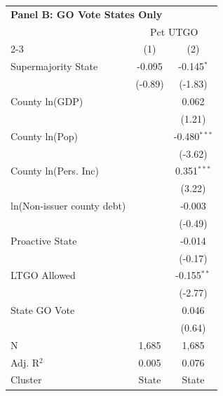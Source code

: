 \begingroup
\centering
\begin{tabular*}{\textwidth}{@{\extracolsep{\fill}}lcc}
\multicolumn{5}{l}{\textbf{Panel B: GO Vote States Only}}\\

\addlinespace
   \toprule
    & \multicolumn{2}{c}{Pct UTGO}\\
   \cmidrule(lr){2-3}
                              & (1)      & (2)\\  
   \midrule 
   Supermajority State        & -0.095   & -0.145$^{*}$\\   
                              & (-0.89) & (-1.83)\\   
   County ln(GDP)             &          & 0.062\\   
                              &          & (1.21)\\   
   County ln(Pop)             &          & -0.480$^{***}$\\   
                              &          & (-3.62)\\   
   County ln(Pers. Inc)       &          & 0.351$^{***}$\\   
                              &          & (3.22)\\   
   ln(Non-issuer county debt) &          & -0.003\\   
                              &          & (-0.49)\\   
   Proactive State            &          & -0.014\\   
                              &          & (-0.17)\\   
   LTGO Allowed               &          & -0.155$^{**}$\\   
                              &          & (-2.77)\\   
   State GO Vote              &          & 0.046\\   
                              &          & (0.64)\\   
   \hline
   N               & 1,685    & 1,685\\  
   Adj. R$^2$             & 0.005    & 0.076\\  
   Cluster              & State & State\\  
   \bottomrule
\end{tabular*}
\par\endgroup
